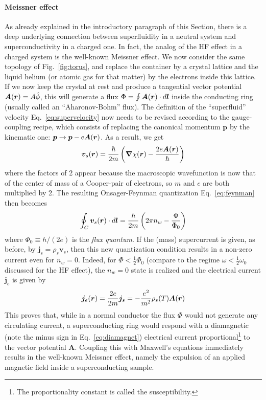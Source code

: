 \paragraph{Meissner effect}
As already explained in the introductory paragraph of this Section,
there is a deep underlying connection between superfluidity in a
neutral system and superconductivity in a charged one. In fact, the
analog of the HF effect in a charged system is the well-known Meissner
effect.
%
We now consider the same topology of Fig.~\ref{fig:torus}, and replace
the container by a crystal lattice and the liquid helium (or atomic
gas for that matter) by the electrons inside this lattice. If we now
keep the crystal at rest and produce a tangential vector potential
$\bm{A}(\bm{r}) = A\hat{\phi}$, this will generate a flux
$\Phi = \oint \bm{A}(\bm{r})\cdot d\bm{l}$ inside the conducting ring (usually
called an ``Aharonov-Bohm'' flux). The definition of the
``superfluid'' velocity Eq.~\eqref{eq:supervelocity} now needs to be
revised according to the gauge-coupling recipe, which consists of
replacing the canonical momentum $\bm{p}$ by the kinematic one:
$\bm{p} \rightarrow \bm{p} - e\bm{A}(\bm{r})$. As a result, we get
%
\begin{equation}\label{eq:superconducting-velocity}
  \bm{v}_s(\bm{r}) = \frac{\hbar}{2m}\left(\bm{\nabla}\chi(\bm{r}) -
    \frac{2e\bm{A}(\bm{r})}{\hbar}\right)
\end{equation}
% 
where the factors of 2 appear because the macroscopic wavefunction is
now that of the center of mass of a Cooper-pair of electrons, so $m$
and $e$ are both multiplied by 2. The resulting Onsager-Feynman
quantization Eq.~\eqref{eq:feynman} then becomes
%
\begin{equation}\label{eq:superconducting-feynman}
  \oint_C \bm{v}_s(\bm{r}) \cdot d\bm{l} = \frac{\hbar}{2m} \left(2\pi n_w -
    \frac{\Phi}{\Phi_0}\right)
\end{equation}
% 
where $\Phi_0 \equiv h/(2e)$ is the \textit{flux quantum}. If the
(mass) supercurrent is given, as before, by
$\bm{j}_s = \rho_s \bm{v}_s$, then this new quantization condition
results in a non-zero current even for $n_w = 0$. Indeed, for
$\Phi < \frac{1}{2} \Phi_0$ (compare to the regime
$\omega < \frac{1}{2}\omega_0$ discussed for the HF effect), the
$n_w = 0$ state is realized and the electrical current $\bm{j}_e$ is
given by
%
\begin{equation}\label{eq:diamagnet}
  \bm{j}_e(\bm{r}) = \frac{2e}{2m}\bm{j}_s = - \frac{e^2}{m^2}\rho_s(T) \bm{A}(\bm{r})
\end{equation}
%
This proves that, while in a normal conductor the flux $\Phi$ would
not generate any circulating current, a superconducting ring would
respond with a diamagnetic (note the minus sign in
Eq.~\eqref{eq:diamagnet}) electrical current proportional\footnote{The
  proportionality constant is called the susceptibility.} to the
vector potential $\bm{A}$. Coupling this with Maxwell's equations
immediately results in the well-known Meissner effect, namely the
expulsion of an applied magnetic field inside a superconducting
sample.


